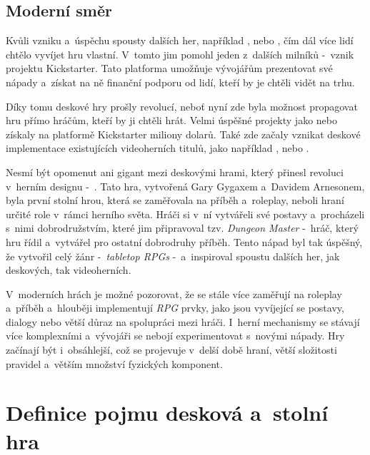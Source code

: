 \subsection{Moderní směr}
\label{subsec:modern}

Kvůli vzniku a~úspěchu spousty dalších her, například ,  nebo , čím dál více lidí chtělo vyvíjet hru vlastní. V~tomto jim pomohl jeden z~dalších milníků -~vznik projektu Kickstarter. Tato platforma umožňuje vývojářům prezentovat své nápady a~získat na ně finanční podporu od lidí, kteří by je chtěli vidět na trhu. \cite{attia_2018}

Díky tomu deskové hry prošly revolucí, neboť nyní zde byla možnost propagovat hru přímo hráčům, kteří by ji chtěli hrát. Velmi úspěšné projekty jako  nebo  získaly na platformě Kickstarter miliony dolarů. Také zde začaly vznikat deskové implementace existujících videoherních titulů, jako například ,  nebo . \cite{kickstarter}

Nesmí být opomenut ani gigant mezi deskovými hrami, který přinesl revoluci v~herním designu -~\textbf{}. Tato hra, vytvořená Gary Gygaxem a~Davidem Arnesonem, byla první stolní hrou, která se zaměřovala na příběh a~roleplay, neboli hraní určité role v~rámci herního světa. Hráči si v~ní vytvářeli své postavy a~procházeli s~nimi dobrodružstvím, které jim připravoval tzv. \textit{Dungeon Master} -~hráč, který hru řídil a~vytvářel pro ostatní dobrodruhy příběh. Tento nápad byl tak úspěšný, že vytvořil celý žánr -~\textit{tabletop RPGs} -~a~inspiroval spoustu dalších her, jak deskových, tak videoherních. \cite{dnd_beyond_2023}

V~moderních hrách je možné pozorovat, že se stále více zaměřují na roleplay a~příběh a~hlouběji implementují \textit{RPG} prvky, jako jsou vyvíjející se postavy, dialogy nebo větší důraz na spolupráci mezi hráči. I~herní mechanismy se stávají více komplexními a~vývojáři se nebojí experimentovat s~novými nápady. Hry začínají být i~obsáhlejší, což se projevuje v~delší době hraní, větší složitosti pravidel a~větším množství fyzických komponent.

\section{Definice pojmu desková a~stolní hra}
\label{subsec:boardgame_definition}

